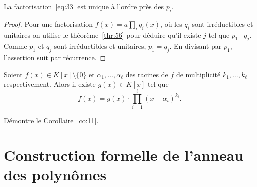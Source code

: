 \begin{theorem}
  \label{thr:57}
  La factorisation~\eqref{eq:33} est unique à l'ordre près des $p_i$. 
\end{theorem}

\begin{proof}
  Pour une  factorisation $f(x) = a ∏_i q_i(x)$, où les $q_i$ sont irréductibles et unitaires on utilise le théorème~\ref{thr:56} pour déduire qu'il  existe $j$ tel que  $p_1 \mid q_j$. Comme $p_1$ et $q_j$ sont  irréductibles et unitaires, $p_1 = q_j$. En divisant par $p_1$, l'assertion suit par récurrence. 
\end{proof}


\begin{corollary}
  \label{co:11}
  Soient $f(x) ∈ K[x] \setminus \{0\}$ et $α_1,\dots, α_ℓ$ des racines de $f$ de multiplicité $k_1,\dots,k_ℓ$ respectivement. Alors il existe $g(x)∈ K[x]$ tel que  
  \begin{displaymath}
    f(x) = g(x) ⋅ ∏_{i=1}^ℓ (x - α_i)^{k_i} .
  \end{displaymath}
\end{corollary}

\begin{exercise}
  Démontre le Corollaire~\ref{co:11}. 
\end{exercise}




\section{Construction formelle de l'anneau des polynômes}
\label{sec:form-constr-ring}

